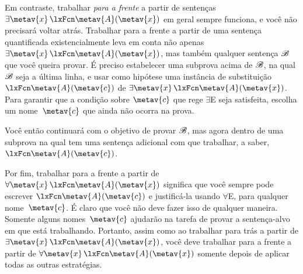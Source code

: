 Em contraste, trabalhar \emph{para a frente} a partir de sentenças $\exists \metav{x}\, \atom{\metav{A}}{\metav{x}}$ em geral sempre funciona, e você não precisará voltar atrás. Trabalhar para a frente a partir de uma sentença quantificada existencialmente leva em conta não apenas $\exists \metav{x}\, \atom{\metav{A}}{\metav{x}}$, mas também qualquer sentença $\mathscr{B}$ que você queira provar. É preciso estabelecer uma subprova acima de $\mathscr{B}$, na qual $\mathscr{B}$ seja a última linha, e usar como hipótese uma instância de substituição $\atom{\metav{A}}{\metav{c}}$ de $\exists \metav{x}\, \atom{\metav{A}}{\metav{x}}$. Para garantir que a condição sobre $\metav{c}$ que rege $\exists$E seja satisfeita, escolha um nome~$\metav{c}$ que ainda não ocorra na prova.
\begin{fitchproof}
	\ellipsesline
	\ellipsesline
	\open
	\AS
	\ellipsesline
	\close
\end{fitchproof}
Você então continuará com o objetivo de provar $\mathscr{B}$, mas agora dentro de uma subprova na qual tem uma sentença adicional com que trabalhar, a saber, $\atom{\metav{A}}{\metav{c}}$.

Por fim, trabalhar para a frente a partir de $\forall \metav{x}\, \atom{\metav{A}}{\metav{x}}$ significa que você sempre pode escrever $\atom{\metav{A}}{\metav{c}}$ e justificá-la usando $\forall$E, para qualquer nome~$\metav{c}$. É claro que você não deve fazer isso de qualquer maneira. Somente alguns nomes~$\metav{c}$ ajudarão na tarefa de provar a sentença-alvo em que está trabalhando. Portanto, assim como ao trabalhar para trás a partir de $\exists \metav{x}\, \atom{\metav{A}}{\metav{x}}$, você deve trabalhar para a frente a partir de $\forall \metav{x}\, \atom{\metav{A}}{\metav{x}}$ somente depois de aplicar todas as outras estratégias.

